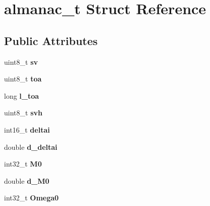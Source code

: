 \hypertarget{structalmanac__t}{\section{almanac\-\_\-t \-Struct \-Reference}
\label{structalmanac__t}
}
\subsection*{\-Public \-Attributes}
\begin{DoxyCompactItemize}
\item 
\hypertarget{structalmanac__t_a0deb5425e0ecd59cb2e61a9666350040}{uint8\-\_\-t {\bfseries sv}}\label{structalmanac__t_a0deb5425e0ecd59cb2e61a9666350040}

\item 
\hypertarget{structalmanac__t_a5ebc6a93593e4f472faba17afb91aa14}{uint8\-\_\-t {\bfseries toa}}\label{structalmanac__t_a5ebc6a93593e4f472faba17afb91aa14}

\item 
\hypertarget{structalmanac__t_ab955e6d2a7f17a20eaaa4f2f2ebfdf2a}{long {\bfseries l\-\_\-toa}}\label{structalmanac__t_ab955e6d2a7f17a20eaaa4f2f2ebfdf2a}

\item 
\hypertarget{structalmanac__t_af1aae5e0812531b022d0fe7972ec7e3d}{uint8\-\_\-t {\bfseries svh}}\label{structalmanac__t_af1aae5e0812531b022d0fe7972ec7e3d}

\item 
\hypertarget{structalmanac__t_a815317b1ed2c90ce58b4c09a0e2d26b6}{int16\-\_\-t {\bfseries deltai}}\label{structalmanac__t_a815317b1ed2c90ce58b4c09a0e2d26b6}

\item 
\hypertarget{structalmanac__t_abbd1330001a5ea7a9254f58afb56be49}{double {\bfseries d\-\_\-deltai}}\label{structalmanac__t_abbd1330001a5ea7a9254f58afb56be49}

\item 
\hypertarget{structalmanac__t_a99e9766197aaa18f7af993a0ef176aab}{int32\-\_\-t {\bfseries \-M0}}\label{structalmanac__t_a99e9766197aaa18f7af993a0ef176aab}

\item 
\hypertarget{structalmanac__t_a5a6dfef0799a4562a56ae8b366fd3678}{double {\bfseries d\-\_\-\-M0}}\label{structalmanac__t_a5a6dfef0799a4562a56ae8b366fd3678}

\item 
\hypertarget{structalmanac__t_a864fa9f4dbb3a8310d3a2ee13c7fc6ec}{int32\-\_\-t {\bfseries \-Omega0}}\label{structalmanac__t_a864fa9f4dbb3a8310d3a2ee13c7fc6ec}


\end{DoxyCompactItemize}
